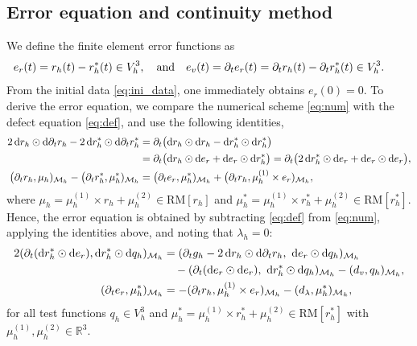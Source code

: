 \documentclass[11pt,a4paper,oneside,reqno]{amsart}
\theoremstyle{definition}
\theoremstyle{plain}
\numberwithin{theorem}{section}
\numberwithin{proposition}{section}
\numberwithin{lemma}{section}
\numberwithin{equation}{section}
\newcommand{\Man}{\mathcal{M}}
\newcommand{\RM}{\mathrm{RM}}
\begin{document}
\subsection{Error equation and continuity method}
We define the finite element error functions as 
\begin{align*}
    \hspace{-3mm}
{e_r}(t)  & = r_h(t) - r_h^*(t) \in V_h^3,  \quad  \text{and} \quad
e_v(t)  = \partial_t e_r(t)  = \partial_t r_h(t) - \partial_t r_h^*(t) \in V_h^3. 
\end{align*}
From the initial data \eqref{eq:ini_data}, one immediately obtains $e_r(0)=0$. 
To derive the error equation, we compare the numerical scheme \eqref{eq:num} with the defect equation \eqref{eq:def}, and use the following identities, 
\begin{align}
2\, \mathrm{d}r_h \odot  \mathrm{d} {\partial_t} r_h - 2\, \mathrm{d} r_h^* \odot \mathrm{d} {\partial_t}r_h^* 
&= \partial_t \big( \mathrm{d}r_h \odot \mathrm{d}r_h - \mathrm{d}r_h^* \odot \mathrm{d}r_h^* \big) \notag \\ 
&= \partial_t \big( \mathrm{d}r_h \odot \mathrm{d} e_r + \mathrm{d}e_r \odot \mathrm{d}r_h^* \big) 
= \partial_t \big( 2\, \mathrm{d}r_h^* \odot \mathrm{d}e_r + \mathrm{d}e_r \odot \mathrm{d}e_r \big), \notag \\
\big( \partial_t r_h, \mu_h )_{\Man_h} - \big( \partial_t r_h^*, \mu_h^* )_{\Man_h}
&= \big( \partial_t e_r, \mu_h^* )_{\Man_h} + \big( \partial_t r_h, \mu_h^{(1)} \times e_r )_{\Man_h},\notag
\end{align}
where  $\mu_h = \mu_h^{(1)} \times r_h + \mu_h^{(2)} \in \RM[r_h]$ and $\mu_h^* = \mu_h^{(1)} \times r_h^* + \mu_h^{(2)} \in \RM[r_h^*]$. 
Hence, the error equation is obtained by subtracting \eqref{eq:def} from \eqref{eq:num}, applying the identities above, and noting that \(\lambda_h=0\):
\begin{subequations}\label{eq:err}  
\begin{align}
2(\partial_t(   \mathrm{d} r_h^* \odot\mathrm{d} e_r), \mathrm{d} r_h^* \odot \mathrm{d} q_h)_{\Man_h} 
 &= ( \partial_t g_h - 2\, \mathrm{d}r_h \odot \mathrm{d} \partial_t r_h,\ \mathrm{d}e_r \odot \mathrm{d}q_h )_{\Man_h}  \notag \\
\label{eq:err-a} 
& \quad
- ( \partial_t (\mathrm{d}e_r \odot \mathrm{d}e_r),\ \mathrm{d}r_h^* \odot \mathrm{d}q_h )_{\Man_h} - (d_v, q_h)_{\Man_h}, \\
\label{eq:err-b} 
( \partial_t e_r, \mu_h^* )_{\Man_h} &= - (\partial_t r_h, \mu_h^{(1)} \times e_r)_{\Man_h} - (d_{\lambda}, \mu_h^*)_{\Man_h},
\end{align}
\end{subequations}
for all test functions  \( q_h \in V_h^3 \) and \( \mu_h^* = \mu^{(1)}_h \times r_h^* + \mu^{(2)}_h \in \RM[r_h^*] \) with $\mu_h^{(1)}, \mu_h^{(2)} \in \mathbb{R}^3$.
\end{document}
